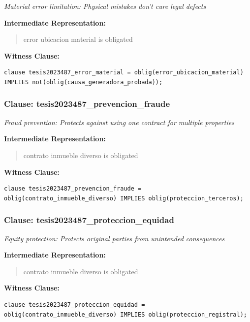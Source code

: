 \documentclass[11pt,a4paper]{article}
\begin{document}
\textit{Material error limitation: Physical mistakes don't cure legal defects}

\textbf{Intermediate Representation:}

\begin{quote}
error ubicacion material is obligated
\end{quote}

\textbf{Witness Clause:}

\begin{lstlisting}[style=witnessstyle, language=Witness]
clause tesis2023487_error_material = oblig(error_ubicacion_material) IMPLIES not(oblig(causa_generadora_probada));
\end{lstlisting}

\subsubsection{Clause: tesis2023487\_prevencion\_fraude}

\textit{Fraud prevention: Protects against using one contract for multiple properties}

\textbf{Intermediate Representation:}

\begin{quote}
contrato inmueble diverso is obligated
\end{quote}

\textbf{Witness Clause:}

\begin{lstlisting}[style=witnessstyle, language=Witness]
clause tesis2023487_prevencion_fraude = oblig(contrato_inmueble_diverso) IMPLIES oblig(proteccion_terceros);
\end{lstlisting}

\subsubsection{Clause: tesis2023487\_proteccion\_equidad}

\textit{Equity protection: Protects original parties from unintended consequences}

\textbf{Intermediate Representation:}

\begin{quote}
contrato inmueble diverso is obligated
\end{quote}

\textbf{Witness Clause:}

\begin{lstlisting}[style=witnessstyle, language=Witness]
clause tesis2023487_proteccion_equidad = oblig(contrato_inmueble_diverso) IMPLIES oblig(proteccion_registral);
\end{lstlisting}
\end{document}
